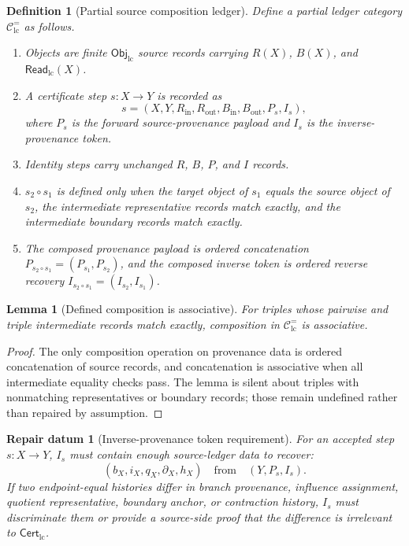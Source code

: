 \documentclass[11pt]{article}
\newcommand{\ObjLC}{\mathsf{Obj}_{\mathrm{lc}}}
\newcommand{\CertLC}{\mathsf{Cert}_{\mathrm{lc}}}
\newcommand{\ReadLC}{\mathsf{Read}_{\mathrm{lc}}}
\newtheorem{definition}{Definition}
\newtheorem{repair}{Repair datum}
\newtheorem{lemma}{Lemma}
\begin{document}
\begin{definition}[Partial source composition ledger]
Define a partial ledger category \(\mathcal{C}_{\mathrm{lc}}^{=}\) as
follows.
\begin{enumerate}
    \item Objects are finite \(\ObjLC\) source records carrying
    \(R(X)\), \(B(X)\), and \(\ReadLC(X)\).
    \item A certificate step \(s:X\to Y\) is recorded as
    \[
    s=(X,Y,R_{\mathrm{in}},R_{\mathrm{out}},B_{\mathrm{in}},
    B_{\mathrm{out}},P_s,I_s),
    \]
    where \(P_s\) is the forward source-provenance payload and \(I_s\)
    is the inverse-provenance token.
    \item Identity steps carry unchanged \(R\), \(B\), \(P\), and \(I\)
    records.
    \item \(s_2\circ s_1\) is defined only when the target object of
    \(s_1\) equals the source object of \(s_2\), the intermediate
    representative records match exactly, and the intermediate boundary
    records match exactly.
    \item The composed provenance payload is ordered concatenation
    \(P_{s_2\circ s_1}=(P_{s_1},P_{s_2})\), and the composed inverse
    token is ordered reverse recovery
    \(I_{s_2\circ s_1}=(I_{s_2},I_{s_1})\).
\end{enumerate}
\end{definition}

\begin{lemma}[Defined composition is associative]
For triples whose pairwise and triple intermediate records match
exactly, composition in \(\mathcal{C}_{\mathrm{lc}}^{=}\) is
associative.
\end{lemma}

\begin{proof}
The only composition operation on provenance data is ordered
concatenation of source records, and concatenation is associative when
all intermediate equality checks pass. The lemma is silent about
triples with nonmatching representatives or boundary records; those
remain undefined rather than repaired by assumption.
\end{proof}

\begin{repair}[Inverse-provenance token requirement]
For an accepted step \(s:X\to Y\), \(I_s\) must contain enough
source-ledger data to recover:
\[
(b_X,i_X,q_X,\partial_X,h_X)
\quad\text{from}\quad
(Y,P_s,I_s).
\]
If two endpoint-equal histories differ in branch provenance, influence
assignment, quotient representative, boundary anchor, or contraction
history, \(I_s\) must discriminate them or provide a source-side proof
that the difference is irrelevant to \(\CertLC\).
\end{repair}
\end{document}
